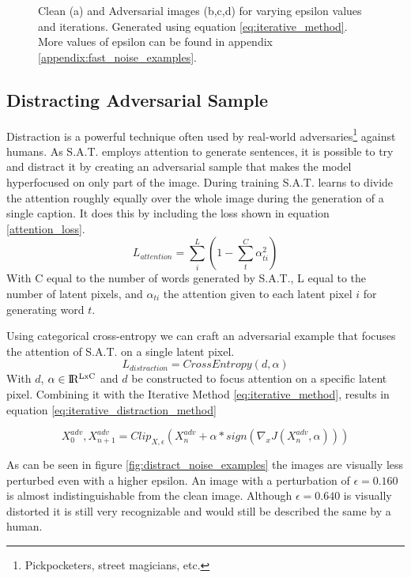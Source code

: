 \begin{figure}[h]
{    }
    \caption{Clean (a) and Adversarial images (b,c,d) for varying epsilon values and iterations. Generated using equation \ref{eq:iterative_method}. More values of epsilon can be found in appendix \ref{appendix:fast_noise_examples}.}
    \label{fig:iterative_noise_examples}
\end{figure}


\subsection*{Distracting Adversarial Sample}
Distraction is a powerful technique often used by real-world adversaries\footnote[1]{Pickpocketers, street magicians, etc.} against humans. As S.A.T. employs attention to generate sentences, it is possible to try and distract it by creating an adversarial sample that makes the model hyperfocused on only part of the image. During training S.A.T. learns to divide the attention roughly equally over the whole image during the generation of a single caption. It does this by including the loss shown in equation \ref{attention_loss}.
\begin{equation}
    L_{attention} = \sum^{L}_i (1 - \sum^{C}_{t} \alpha_{ti}^2)
    \label{attention_loss}
\end{equation}
\noindent With C equal to the number of words generated by S.A.T., L equal to the number of latent pixels, and $\alpha_{ti}$ the attention given to each latent pixel $i$ for generating word $t$.

Using categorical cross-entropy we can craft an adversarial example that focuses the attention of S.A.T. on a single latent pixel.
\begin{equation}
    L_{distraction} = CrossEntropy(d, \alpha)
    \label{distraction_loss}
\end{equation}
With $d$, $\alpha \in \rm I\!R^{LxC}$ and $d$ be constructed to focus attention on a specific latent pixel. Combining it with the Iterative Method \ref{eq:iterative_method}, results in equation \ref{eq:iterative_distraction_method}

\begin{equation}
    X^{adv}_{0}, X^{adv}_{n + 1} = Clip_{X, \epsilon}(X^{adv}_{n} + \alpha * sign(\nabla_{x}J(X^{adv}_{n}, \alpha)))
    \label{eq:iterative_distraction_method}
\end{equation}

As can be seen in figure \ref{fig:distract_noise_examples} the images are visually less perturbed even with a higher epsilon. An image with a perturbation of $\epsilon=0.160$ is almost indistinguishable from the clean image. Although $\epsilon=0.640$ is visually distorted it is still very recognizable and would still be described the same by a human.

